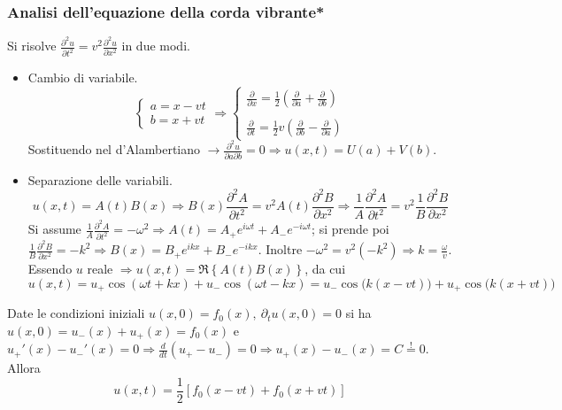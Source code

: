\documentclass[a4paper]{scrartcl}
\numberwithin{equation}{subsection}
\theoremstyle{style1}
\begin{document}
\subsubsection{Analisi dell'equazione della corda vibrante*}
Si risolve $\frac{\partial ^2u }{\partial t^2} = v^2 \frac{\partial ^2 u }{\partial x^2} $ in due modi.
\begin{itemize}
	\item Cambio di variabile.
		\[
		\begin{cases}
			a=x-vt \\
			b = x+vt
		\end{cases}\Rightarrow \begin{cases}
			\displaystyle \frac{\partial }{\partial x} = \frac{1}{2} \left(\frac{\partial }{\partial a} + \frac{\partial }{\partial b} \right) \\
			\\
			\displaystyle \frac{\partial }{\partial t} = \frac{1}{2}v \left(\frac{\partial }{\partial b} - \frac{\partial }{\partial a} \right) 
		\end{cases}
		\] 
	Sostituendo nel d'Alambertiano $\to \frac{\partial ^2 u }{\partial a \partial b} =0\Rightarrow u (x,t) = U(a) + V(b)$.
\item Separazione delle variabili.
	\[
		u (x,t) = A(t) B(x) \Rightarrow B(x) \frac{\partial ^2 A}{\partial t^2} = v^2 A(t) \frac{\partial ^2 B}{\partial x^2} \Rightarrow \frac{1}{A}\frac{\partial ^2 A}{\partial t^2} = v^2 \frac{1}{B}\frac{\partial ^2B}{\partial x^2} 
	\] 
Si assume $\frac{1}{A} \frac{\partial ^2A}{\partial t^2} =-\omega^2\Rightarrow A(t) = A_+ e^{i\omega t} + A_- e^{-i\omega t}  $; si prende poi $\frac{1}{B}\frac{\partial ^2B}{\partial x^2} =-k^2\Rightarrow B(x) = B_+ e^{ikx}+B_- e^{-ikx}  $. Inoltre $-\omega^2 = v^2 (-k^2) \Rightarrow k = \frac{\omega}{v}$. Essendo $u $ reale $\Rightarrow u (x,t) = \Re\left\{ A(t) B(x) \right\} $, da cui
\begin{equation*}
	u(x,t) = u _+ \cos(\omega t + kx) + u _-\cos(\omega t - kx)=u _- \cos\big(k(x-vt)\big) + u _+ \cos\big(k(x+vt)\big)
\end{equation*}
\end{itemize}
Date le condizioni iniziali $u (x,0) = f_0(x), \ \partial _t u(x,0) = 0$ si ha $u(x,0) = u_- (x) + u_+(x) = f_0(x)$ e $u_+'(x) - u_-' (x) = 0 \Rightarrow \frac{d }{d t} (u_+ - u_-) = 0\Rightarrow u_+(x) - u_-(x) = C\stackrel{!}{=}0$. Allora
\begin{equation}
	u(x,t) = \frac{1}{2}\left[ f_0(x-vt) + f_0 (x+vt)\right] 
\end{equation}
\end{document}
